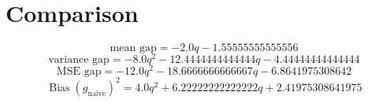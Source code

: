 \documentclass{article}
\begin{document}
\section*{Comparison}
\begin{dmath*}
\text{mean gap} = - 2.0 q - 1.55555555555556
\end{dmath*}
\begin{dmath*}
\text{variance gap} = - 8.0 q^{2} - 12.4444444444444 q - 4.44444444444444
\end{dmath*}
\begin{dmath*}
\text{MSE gap} = - 12.0 q^{2} - 18.6666666666667 q - 6.8641975308642
\end{dmath*}
\begin{dmath*}
\operatorname{Bias}(g_{\mathrm{naive}})^2 = 4.0 q^{2} + 6.22222222222222 q + 2.41975308641975
\end{dmath*}
\end{document}
